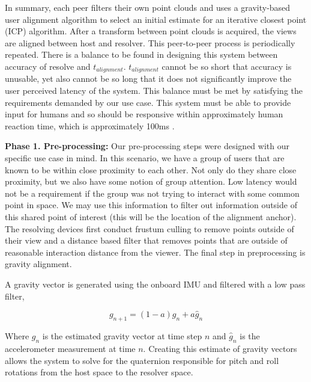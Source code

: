 \documentclass{vgtc}                          %
\begin{document}
In summary, each peer filters their own point clouds and uses a gravity-based user alignment algorithm to select an initial 
estimate for an iterative closest point (ICP) algorithm. After a transform between point clouds is acquired, the 
views are aligned between host and resolver. This peer-to-peer process is periodically repeated. There is a balance 
to be found in designing this system between accuracy of resolve and $t_{alignment}$. $t_{alignment}$ cannot be so 
short that accuracy is unusable, yet also cannot be so long that it does not significantly improve the user perceived 
latency of the system. This balance must be met by satisfying the requirements demanded by our use case. This system must be able to provide 
input for humans and so should be responsive within approximately human reaction time, which is approximately 100ms \cite{MARVEL}.


{\bf Phase 1. Pre-processing: }
Our pre-processing steps were designed with our specific use case in mind. In this scenario, we 
have a group of users that are known to be within close proximity to each other. Not only do they share close proximity, but we also have some 
notion of group attention. Low latency would not be a requirement if the group was not trying to interact with some common point in space. We may 
use this information to filter out information outside of this shared point of interest (this will be the location of the alignment anchor). 
The resolving devices first conduct frustum culling to remove points outside of their view and a distance based filter that removes points 
that are outside of reasonable interaction distance from the viewer. The final step in preprocessing is gravity alignment. 

A gravity vector is generated using the onboard IMU %
and filtered with a low pass filter,

\begin{equation}
    g_{n+1} = (1-a)g_{n} + a\hat{g}_{n}
\end{equation}



Where $g_n$ is the estimated gravity vector at time step $n$ and $\hat{g}_n$ is the accelerometer measurement at time $n$. Creating this estimate 
of gravity vectors allows the system to solve for the quaternion responsible for pitch and roll rotations from the host space to the resolver space.
\end{document}
